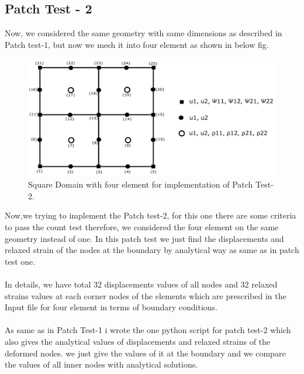 \documentclass[12pt]{article}
\begin{document}
\subsection{Patch Test - 2}
Now, we considered the same geometry with same dimensions as described in Patch test-1, but now we mesh it into four element as shown in below fig.
\begin{figure}[H]
	\begin{center}
		\includegraphics[scale=0.75]{ele_4.png} 
	\end{center}  
    \caption{Square Domain with four element for implementation of Patch Test-2.}
\end{figure}
Now,we trying to implement the Patch test-2, for this one there are some criteria to pass the count test therefore, we considered the four element on the same geometry instead of one. In this patch test we just find the displacements and relaxed strain of the nodes at the boundary by analytical way as same as in patch test one. 
\\
\\
In details, we have total 32 displacements values of all nodes and 32 relaxed strains values at each corner nodes of the elements which are prescribed in the Input file for four element in terms of boundary conditions.
\\
\\
As same as in Patch Test-1 i wrote the one python script for patch test-2 which also gives the analytical values of displacements and relaxed strains of the deformed nodes. we just give the values of it at the boundary and we compare the values of all inner nodes with analytical solutions.
\end{document}

